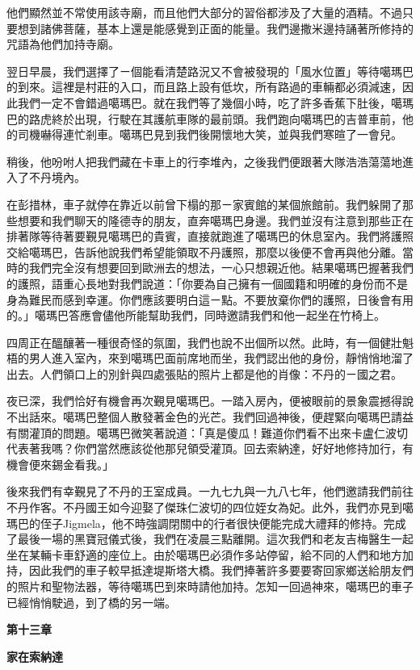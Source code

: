 他們顯然並不常使用該寺廟，而且他們大部分的習俗都涉及了大量的酒精。不過只要想到諸佛菩薩，基本上還是能感覺到正面的能量。我們邊撒米邊持誦著所修持的咒語為他們加持寺廟。

翌日早晨，我們選擇了ㄧ個能看清楚路況又不會被發現的「風水位置」等待噶瑪巴的到來。這裡是村莊的入口，而且路上設有低坎，所有路過的車輛都必須減速，因此我們一定不會錯過噶瑪巴。就在我們等了幾個小時，吃了許多香蕉下肚後，噶瑪巴的路虎終於出現，行駛在其護航車隊的最前頭。我們跑向噶瑪巴的吉普車前，他的司機嚇得連忙剎車。噶瑪巴見到我們後開懷地大笑，並與我們寒暄了一會兒。

稍後，他吩咐人把我們藏在卡車上的行李堆內，之後我們便跟著大隊浩浩蕩蕩地進入了不丹境內。

在彭措林，車子就停在靠近以前曾下榻的那ㄧ家賓館的某個旅館前。我們躲開了那些想要和我們聊天的隆德寺的朋友，直奔噶瑪巴身邊。我們並沒有注意到那些正在排著隊等待著要覲見噶瑪巴的貴賓，直接就跑進了噶瑪巴的休息室內。我們將護照交給噶瑪巴，告訴他說我們希望能領取不丹護照，那麼以後便不會再與他分離。當時的我們完全沒有想要回到歐洲去的想法，一心只想親近他。結果噶瑪巴握著我們的護照，語重心長地對我們說道：「你要為自己擁有一個國籍和明確的身份而不是身為難民而感到幸運。你們應該要明白這ㄧ點。不要放棄你們的護照，日後會有用的。」噶瑪巴答應會儘他所能幫助我們，同時邀請我們和他一起坐在竹椅上。

四周正在醞釀著一種很奇怪的氛圍，我們也說不出個所以然。此時，有一個健壯魁梧的男人進入室內，來到噶瑪巴面前席地而坐，我們認出他的身份，靜悄悄地溜了出去。人們領口上的別針與四處張貼的照片上都是他的肖像：不丹的ㄧ國之君。

夜已深，我們恰好有機會再次覲見噶瑪巴。一踏入房內，便被眼前的景象震撼得說不出話來。噶瑪巴整個人散發著金色的光芒。我們回過神後，便趕緊向噶瑪巴請益有關灌頂的問題。噶瑪巴微笑著說道：「真是傻瓜！難道你們看不出來卡盧仁波切代表著我嗎？你們當然應該從他那兒領受灌頂。回去索納達，好好地修持加行，有機會便來錫金看我。」

後來我們有幸覲見了不丹的王室成員。一九七九與一九八七年，他們邀請我們前往不丹作客。不丹國王如今迎娶了傑珠仁波切的四位姪女為妃。此外，我們亦見到噶瑪巴的侄子Jigmela，他不時強調閉關中的行者很快便能完成大禮拜的修持。完成了最後一場的黑寶冠儀式後，我們在凌晨三點離開。這次我們和老友吉梅醫生一起坐在某輛卡車舒適的座位上。由於噶瑪巴必須作多站停留，給不同的人們和地方加持，因此我們的車子較早抵達堤斯塔大橋。我們捧著許多要要寄回家鄉送給朋友們的照片和聖物法器，等待噶瑪巴到來時請他加持。怎知一回過神來，噶瑪巴的車子已經悄悄駛過，到了橋的另一端。

\textbf{第十三章}

\textbf{家在索納達}

